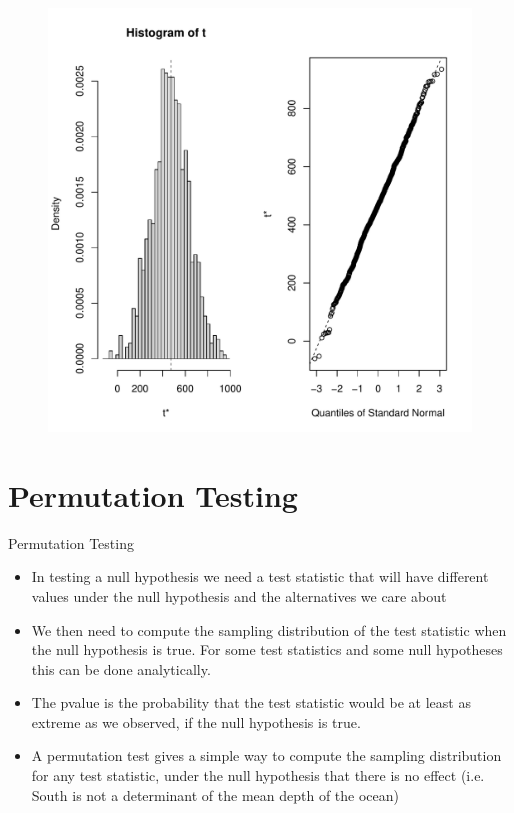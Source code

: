 \documentclass[10pt]{beamer}\usepackage[]{graphicx}\usepackage[]{color}
\makeatletter
\def\maxwidth{ %
  \ifdim\Gin@nat@width>\linewidth
    \linewidth
  \else
    \Gin@nat@width
  \fi
}
\newenvironment{knitrout}{}{} %
\makeatother
\begin{document}
\begin{frame}
\begin{figure}
\begin{minipage}[h]{0.50\linewidth}
\begin{knitrout}
{\centering \includegraphics[width=\maxwidth]{figure/unnamed-chunk-13-1} 

}


\end{knitrout}
	\end{minipage}
\end{figure}
\end{frame}


\section{Permutation Testing}

\begin{frame}{Permutation Testing}
\begin{itemize}
	\item In testing a null hypothesis we need a test statistic that will have different values under the null hypothesis and the alternatives we	care about 
	\item We then need to compute the sampling distribution of the test	statistic when the null hypothesis is true. For some test statistics	and some null hypotheses this can be done analytically. 
	\item The pvalue is the probability that the test statistic would be at	least as extreme as we observed, if the null hypothesis is true.
	\item A permutation test gives a simple way to compute the sampling	distribution for any test statistic, under the null hypothesis that there is no effect (i.e. South is not a determinant of the mean depth of the ocean)
\end{itemize}
\end{frame}
\end{document}
